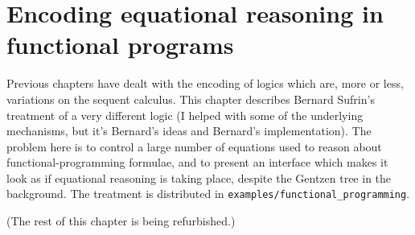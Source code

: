 \chapter{Encoding equational reasoning in functional programs}
\label{chap:funcprog}

Previous chapters have dealt with the encoding of logics which are, more or less, variations on the sequent calculus. This chapter describes Bernard Sufrin's treatment of a very different logic (I helped with some of the underlying mechanisms, but it's Bernard's ideas and Bernard's implementation). The problem here is to control a large number of equations used to reason about functional-programming formulae, and to present an interface which makes it look as if equational reasoning is taking place, despite the Gentzen tree in the background. The treatment is distributed in \texttt{examples/functional\_programming}.

(The rest of this chapter is being refurbished.)



